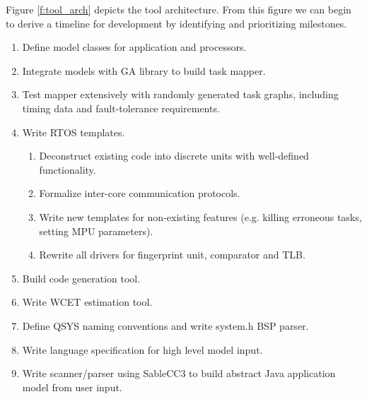\documentclass[table,11pt]{article}
\begin{document}
Figure \ref{f:tool_arch} depicts the tool architecture. 
From this figure we can begin to derive a timeline for development by identifying and prioritizing milestones. 

\begin{enumerate}
\item Define model classes for application and processors.
\item Integrate models with GA library to build task mapper.
\item Test mapper extensively with randomly generated task graphs, including timing data and fault-tolerance requirements.
\item Write RTOS templates.
  \begin{enumerate}
  \item Deconstruct existing code into discrete units with well-defined functionality.
  \item Formalize inter-core communication protocols.
  \item Write new templates for non-existing features (e.g. killing erroneous tasks, setting MPU parameters).
  \item Rewrite all drivers for fingerprint unit, comparator and TLB.
  \end{enumerate}
\item Build code generation tool.
\item Write WCET estimation tool.
\item Define QSYS naming conventions and write system.h BSP parser.
\item Write language specification for high level model input.
\item Write scanner/parser using SableCC3 to build abstract Java application model from user input. 
\end{enumerate}




\end{document}
